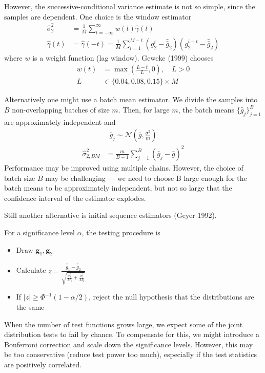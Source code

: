 \documentclass{article}
\begin{document}
However, the successive-conditional variance estimate is not so simple, since the samples are dependent. One choice is the window estimator
\begin{align*}
    \hat{\sigma}_{2}^{2} &= \frac{1}{M}\sum_{t=-\infty}^{\infty} w(t) \hat{\gamma}(t) \\
    \hat{\gamma}(t) &= \hat{\gamma}(-t) = \frac{1}{M}\sum_{i=1}^{M-t}(g_{2}^{i} - \hat{\bar{g}}_{2})(g_{2}^{i+t} - \hat{\bar{g}}_{2})
\end{align*}
where $w$ is a weight function (lag window). Geweke (1999) chooses
\begin{align*}
    w(t) &= \max{\left(\frac{L-t}{L}, 0\right)}, \quad L > 0 \\
    L &\in \{0.04, 0.08, 0.15\} \times M
\end{align*}

Alternatively one might use a batch mean estimator. We divide the samples into $B$ non-overlapping batches of size $m$. Then, for large $m$, the batch means $\{\bar{g}_{j}\}_{j=1}^{B}$ are approximately independent and
\begin{align*}
    \bar{g}_{j} \sim \mathcal{N}(\bar{g}, \frac{\sigma^{2}}{m})
\end{align*}
\begin{align*}
    \hat{\sigma}_{2, BM}^{2} &= \frac{m}{B-1}\sum_{j=1}^{B} (\bar{g}_{j} - \bar{g})^{2}
\end{align*}
Performance may be improved using multiple chains. However, the choice of batch size $B$ may be challenging --- we need to choose B large enough for the batch means to be approximately independent, but not so large that the confidence interval of the estimator explodes.

Still another alternative is initial sequence estimators (Geyer 1992).

For a significance level $\alpha$, the testing procedure is
\begin{itemize}
    \item Draw $\mathbf{g}_{1}, \mathbf{g}_{2}$
    \item Calculate $z=\frac{\hat{\bar{g}}_{1} - \hat{\bar{g}}_{2}}{\sqrt{ \frac{\hat{\sigma}^{2}_{1}}{M_{1}} + \frac{\hat{\sigma}^{2}_{2}}{M_{2}}}}$
    \item If $|z| \geq \Phi^{-1}(1-\alpha/2)$, reject the null hypothesis that the distributions are the same
\end{itemize}

When the number of test functions grows large, we expect some of the joint distribution tests to fail by chance. To compensate for this, we might introduce a Bonferroni correction and scale down the significance levels. However, this may be too conservative (reduce test power too much), especially if the test statistics are positively correlated. 
\end{document}
